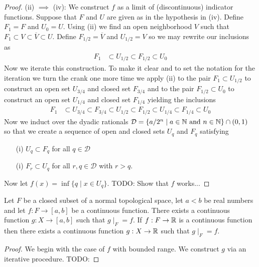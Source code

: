\begin{proof}
(ii) $\implies$ (iv):  We construct $f$ as a limit of (discontinuous)
indicator functions.  Suppose that $F$ and $U$ are given as in the
hypothesis in (iv).  Define $F_1 = F$ and $U_0 = U$.  Using (ii) we
find an open neighborhood $V$ such that $F_1 \subset V \subset
\overline{V} \subset U$.  Define $F_{1/2} = \overline{V}$ and $U_{1/2}
= V$ so we may rewrite our inclusions as 
\begin{align*}
F_1 &\subset U_{1/2} \subset F_{1/2} \subset U_{0}
\end{align*}
Now we iterate this construction.  To make it clear and to set the
notation for the iteration we turn the crank one more time we apply
(ii) to the pair $F_1 \subset U_{1/2}$ to construct an open set $U_{3/4}$
and closed set $F_{3/4}$ and to the pair $F_{1/2} \subset U_{0}$ to
construct an open set $U_{1/4}$
and closed set $F_{1/4}$ yielding the inclusions
\begin{align*}
F_1 &\subset U_{3/4} \subset F_{3/4} \subset U_{1/2} \subset F_{1/2} \subset U_{1/4} \subset F_{1/4} \subset U_{0}
\end{align*}
Now we induct over the dyadic rationals $\mathcal{D} = \lbrace a/2^n
\mid a \in \mathbb{N} \text{ and } n \in \mathbb{N} \rbrace \cap (0,1)$ so that we create a sequence
of open and closed sets $U_q$ and $F_q$ satisfying
\begin{itemize}
\item[(i)] $U_q \subset F_q$ for all $q \in \mathcal{D}$
\item[(i)] $F_r \subset U_q$ for all $r,q \in \mathcal{D}$ with $r > q$.
\end{itemize}
Now let $f(x) = \inf \lbrace q \mid x \in U_q \rbrace$.  
TODO: Show that $f$ works...
\end{proof}

\begin{thm}\label{TietzeExtensionTheorem}Let $F$ be a closed subset of
  a normal topological space, let $a < b$ be real numbers and let $f :
  F \to [a,b]$ be a continuous function.  There exists a continuous
  function $g : X \to [a,b]$ such that $g\mid_F = f$.  If $f : F \to
  \mathbb{R}$ is a continuous function then there exists a continuous
  function $g: X \to \mathbb{R}$ such that $g \mid_F = f$.
\end{thm}
\begin{proof}
We begin with the case of $f$ with bounded range.  We construct $g$
via an iterative procedure.  
TODO:
\end{proof}

